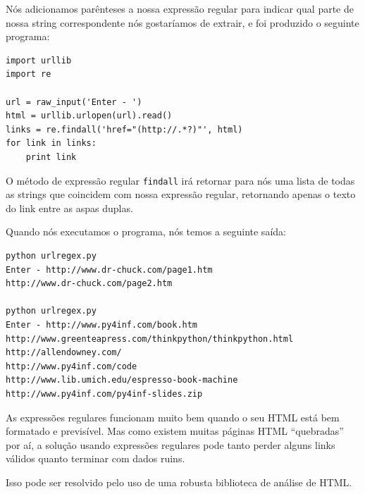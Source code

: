Nós adicionamos parênteses a nossa expressão regular para indicar
qual parte de nossa string correspondente nós gostaríamos de extrair, e
foi produzido o seguinte programa:

\beforeverb
\begin{verbatim}
import urllib
import re

url = raw_input('Enter - ')
html = urllib.urlopen(url).read()
links = re.findall('href="(http://.*?)"', html)
for link in links:
    print link
\end{verbatim}
\afterverb

O método de expressão regular {\tt findall} irá retornar para nós uma
lista de todas as strings que coincidem com nossa expressão regular,
retornando apenas o texto do link entre as aspas duplas.

Quando nós executamos o programa, nós temos a seguinte saída:

\beforeverb
\begin{verbatim}
python urlregex.py 
Enter - http://www.dr-chuck.com/page1.htm
http://www.dr-chuck.com/page2.htm

python urlregex.py 
Enter - http://www.py4inf.com/book.htm
http://www.greenteapress.com/thinkpython/thinkpython.html
http://allendowney.com/
http://www.py4inf.com/code
http://www.lib.umich.edu/espresso-book-machine
http://www.py4inf.com/py4inf-slides.zip
\end{verbatim}
\afterverb

As expressões regulares funcionam muito bem quando o seu HTML está bem
formatado e previsível.  Mas como existem muitas páginas HTML ``quebradas''
por aí, a solução usando expressões regulares pode tanto perder alguns
links válidos quanto terminar com dados ruins.

Isso pode ser resolvido pelo uso de uma robusta biblioteca de análise
de HTML.

